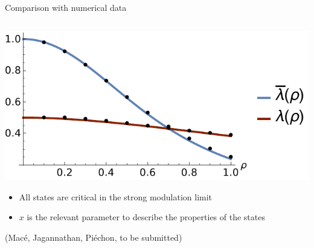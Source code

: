 \documentclass[xcolor=x11names,compress,professionalfonts]{beamer}
\renewcommand{\(}{\begin{columns}}
\renewcommand{\)}{\end{columns}}
\newcommand{\<}[1]{\begin{column}{#1}}
\renewcommand{\>}{\end{column}}
\begin{document}
\begin{frame}{Comparison with numerical data}
\begin{columns}
\begin{column}{6cm}
		\includegraphics[scale=.5]{renorm_th_num.pdf}
		
		\begin{itemize}
			\item All states are critical in the strong modulation limit
			\item $x$ is the relevant parameter to describe the properties of the states
		\end{itemize}
		
		\begin{flushright}
		\scriptsize{(Macé, Jagannathan, Piéchon, to be submitted)}
		\end{flushright}
	\end{column}
\end{columns}
\end{frame}
\end{document}
